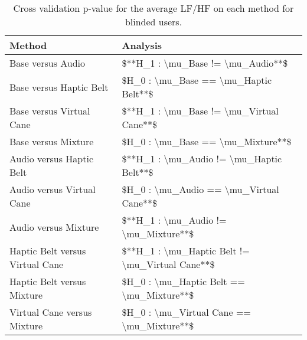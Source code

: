 
\begin{table}[!htb]
\centering
\caption{Cross validation p-value for the average LF/HF on each method for blinded users.}
\label{tab:lsd_average_lfhf}
\begin{tabular}{ll}
\toprule
                         Method &                                        Analysis \\
\midrule
              Base versus Audio &               \$**H\_1 : \textbackslash mu\_Base != \textbackslash mu\_Audio**\$ \\
        Base versus Haptic Belt &           \$H\_0 : \textbackslash mu\_Base == \textbackslash mu\_Haptic Belt**\$ \\
       Base versus Virtual Cane &        \$**H\_1 : \textbackslash mu\_Base != \textbackslash mu\_Virtual Cane**\$ \\
            Base versus Mixture &               \$H\_0 : \textbackslash mu\_Base == \textbackslash mu\_Mixture**\$ \\
       Audio versus Haptic Belt &        \$**H\_1 : \textbackslash mu\_Audio != \textbackslash mu\_Haptic Belt**\$ \\
      Audio versus Virtual Cane &         \$H\_0 : \textbackslash mu\_Audio == \textbackslash mu\_Virtual Cane**\$ \\
           Audio versus Mixture &            \$**H\_1 : \textbackslash mu\_Audio != \textbackslash mu\_Mixture**\$ \\
Haptic Belt versus Virtual Cane & \$**H\_1 : \textbackslash mu\_Haptic Belt != \textbackslash mu\_Virtual Cane**\$ \\
     Haptic Belt versus Mixture &        \$H\_0 : \textbackslash mu\_Haptic Belt == \textbackslash mu\_Mixture**\$ \\
    Virtual Cane versus Mixture &       \$H\_0 : \textbackslash mu\_Virtual Cane == \textbackslash mu\_Mixture**\$ \\
\bottomrule
\end{tabular}
\end{table}

